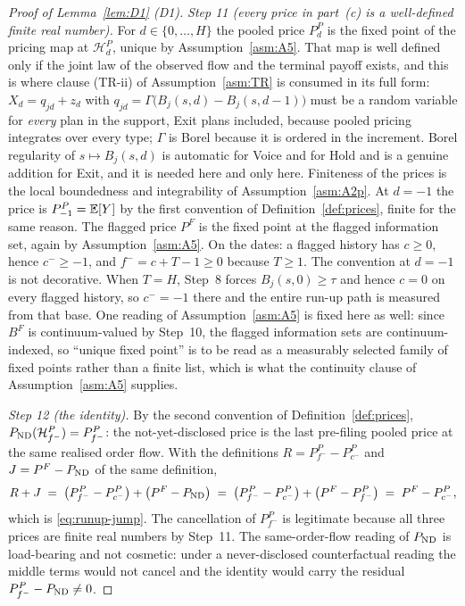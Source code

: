 \begin{proof}[Proof of Lemma~\ref{lem:D1} (D1)]
\emph{Step 11 (every price in part~(c) is a well-defined finite real number).} For
$d \in \{0,\dots,H\}$ the pooled price $P_d^P$ is the fixed point of the pricing map at
$\mathcal H_d^P$, unique by Assumption~\ref{asm:A5}. That map is well defined only if the joint law
of the observed flow and the terminal payoff exists, and this is where clause (TR-ii) of
Assumption~\ref{asm:TR} is consumed in its full form: $X_d = q_{jd} + z_d$ with
$q_{jd} = \Gamma\bigl(B_j(s,d)-B_j(s,d-1)\bigr)$ must be a random variable for \emph{every} plan in
the support, Exit plans included, because pooled pricing integrates over every type; $\Gamma$ is
Borel because it is ordered in the increment. Borel regularity of $s \mapsto B_j(s,d)$ is automatic
for Voice and for Hold and is a genuine addition for Exit, and it is needed here and only here.
Finiteness of the prices is the local boundedness and integrability of Assumption~\ref{asm:A2p}. At
$d = -1$ the price is $P_{-1}^P = \mathbb{E}[Y]$ by the first convention of
Definition~\ref{def:prices}, finite for the same reason. The flagged price $P^F$ is the fixed point
at the flagged information set, again by Assumption~\ref{asm:A5}. On the dates: a flagged history has
$c \ge 0$, hence $c^- \ge -1$, and $f^- = c+T-1 \ge 0$ because $T \ge 1$. The convention at $d=-1$ is
not decorative. When $T = H$, Step~8 forces $B_j(s,0) \ge \tau$ and hence $c = 0$ on every flagged
history, so $c^- = -1$ there and the entire run-up path is measured from that base. One reading of
Assumption~\ref{asm:A5} is fixed here as well: since $B^F$ is continuum-valued by Step~10, the
flagged information sets are continuum-indexed, so ``unique fixed point'' is to be read as a
measurably selected family of fixed points rather than a finite list, which is what the continuity
clause of Assumption~\ref{asm:A5} supplies.

\emph{Step 12 (the identity).} By the second convention of Definition~\ref{def:prices},
$P_{\mathrm{ND}}(\mathcal H_{f^-}^P) = P_{f^-}^P$: the not-yet-disclosed price is the last pre-filing pooled
price at the same realised order flow. With the definitions $R = P_{f^-}^P - P_{c^-}^P$ and
$J = P^F - P_{\mathrm{ND}}$ of the same definition,
\begin{equation}
\label{eq:D1-telescope}
R + J \;=\; \bigl(P_{f^-}^P - P_{c^-}^P\bigr) + \bigl(P^F - P_{\mathrm{ND}}\bigr)
       \;=\; \bigl(P_{f^-}^P - P_{c^-}^P\bigr) + \bigl(P^F - P_{f^-}^P\bigr)
       \;=\; P^F - P_{c^-}^P ,
\end{equation}
which is \eqref{eq:runup-jump}. The cancellation of $P_{f^-}^P$ is legitimate because all three
prices are finite real numbers by Step~11. The same-order-flow reading of $P_{\mathrm{ND}}$ is load-bearing
and not cosmetic: under a never-disclosed counterfactual reading the middle terms would not cancel
and the identity would carry the residual $P_{f^-}^P - P_{\mathrm{ND}} \ne 0$.


\end{proof}
